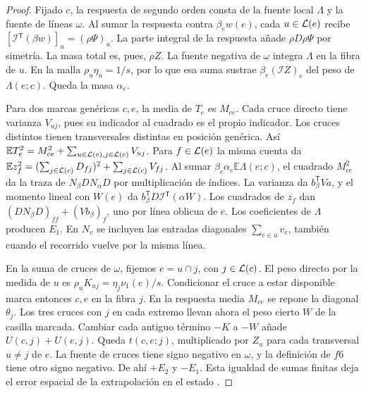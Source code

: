 \begin{proof}
Fijado \(c\), la respuesta de segundo orden consta de la fuente local \(\Lambda\) y
la fuente de líneas \(\omega\). Al sumar la respuesta contra \(\beta_e w(e)\), cada
\(u\in \mathcal L(e)\) recibe \([\mathcal I{}^{\mathsf T}(\beta w)]_u=(\rho\Psi)_u\).
La parte integral de la respuesta añade \(\rho D\rho\Psi\) por simetría. La masa
total es, pues, \(\rho Z\). La fuente negativa de \(\omega\) integra \(\Lambda\) en
la fibra de \(u\). En la malla \(\rho_u\eta_u=1/s\), por lo que esa suma sustrae
\(\beta_e(\mathcal I{}Z)_e\) del peso de \(\Lambda(e;c)\). Queda la masa \(\alpha_e\).

Para dos marcas genéricas \(c,e\), la media de \(T_e\) es \(M_{ce}\).
Cada cruce directo tiene varianza \(V_{uj}\), pues su indicador al cuadrado es el propio
indicador. Los cruces distintos tienen transversales distintas en posición genérica.
Así \(\mathbb E T_e^2=M_{ce}^2+\sum_{u\in \mathcal L(e),j\in \mathcal L(c)}V_{uj}\).
Para \(f\in \mathcal L(e)\) la misma cuenta da
\(\mathbb E z_f^2=(\sum_{j\in \mathcal L(c)}D_{fj})^2+\sum_{j\in \mathcal L(c)}V_{fj}\).
Al sumar \(\beta_c\alpha_e\mathbb E\Lambda(e;c)\), el cuadrado \(M_{ce}^2\)
da la traza de \(N_\beta D N_\alpha D\) por multiplicación de índices.
La varianza da \(b_\beta^{\mathsf T}Va\), y el momento lineal con \(W(e)\)
da \(b_\beta^{\mathsf T}D\mathcal I{}^{\mathsf T}(\alpha W)\).
Los cuadrados de \(z_f\) dan \((DN_\beta D)_{ff}+(Vb_\beta)_f\), uno por línea
oblicua de \(e\). Los coeficientes de \(\Lambda\) producen \(E_1\).
En \(N_v\) se incluyen las entradas diagonales \(\sum_{e\in u}v_e\), también cuando
el recorrido vuelve por la misma línea.

En la suma de cruces de \(\omega\), fijemos \(e=u\cap j\), con \(j\in \mathcal L(c)\).
El peso directo por la medida de \(u\) es \(\rho_uK_{uj}=\eta_j\nu_1(e)/s\).
Condicionar el cruce a estar disponible marca entonces \(c,e\) en la fibra \(j\).
En la respuesta media \(M_{ce}\) se repone la diagonal \(\theta_j\).
Los tres cruces con \(j\) en cada extremo llevan ahora el peso cierto \(W\) de la
casilla marcada. Cambiar cada antiguo término \(-K\) a \(-W\) añade \(U(c,j)+U(e,j)\).
Queda \(t(c,e;j)\), multiplicado por \(Z_u\) para cada transversal \(u\ne j\) de \(e\).
La fuente de cruces tiene signo negativo en \(\omega\), y la definición de \(f6\)
tiene otro signo negativo. De ahí \(+E_2\) y \(-E_1\). Esta igualdad de sumas
finitas deja el error espacial de la extrapolación en el estado .
\end{proof}
